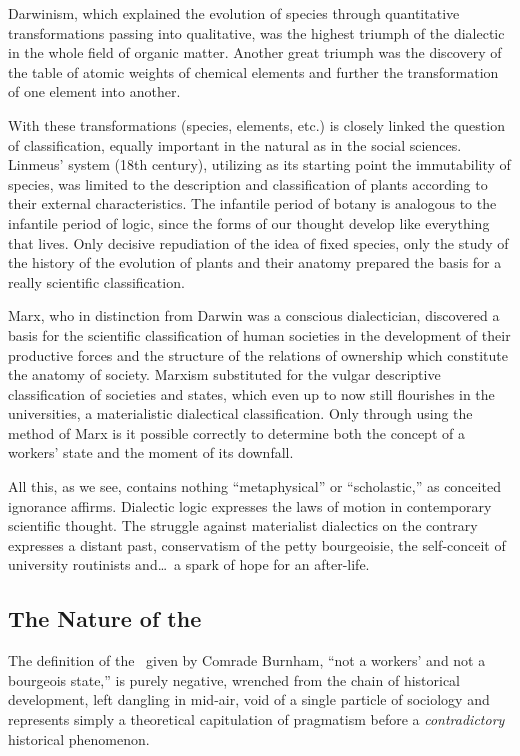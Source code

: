 Darwinism, which explained the evolution of species through quantitative transformations passing into qualitative, was the highest triumph of the dialectic in the whole field of organic matter. Another great triumph was the discovery of the table of atomic weights of chemical elements and further the transformation of one element into another.

With these transformations (species, elements, etc.) is closely linked the question of classification, equally important in the natural as in the social sciences. Linmeus’ system (18th century), utilizing as its starting point the immutability of species, was limited to the description and classification of plants according to their external characteristics. The infantile period of botany is analogous to the infantile period of logic, since the forms of our thought develop like everything that lives. Only decisive repudiation of the idea of fixed species, only the study of the history of the evolution of plants and their anatomy prepared the basis for a really scientific classification.

Marx, who in distinction from Darwin was a conscious dialectician, discovered a basis for the scientific classification of human societies in the development of their productive forces and the structure of the relations of ownership which constitute the anatomy of society. Marxism substituted for the vulgar descriptive classification of societies and states, which even up to now still flourishes in the universities, a materialistic dialectical classification. Only through using the method of Marx is it possible correctly to determine both the concept of a workers’ state and the moment of its downfall.

All this, as we see, contains nothing “metaphysical” or “scholastic,” as conceited ignorance affirms. Dialectic logic expresses the laws of motion in contemporary scientific thought. The struggle against materialist dialectics on the contrary expresses a distant past, conservatism of the petty bourgeoisie, the self-conceit of university routinists and\dots\ a spark of hope for an after-life.

\subsection*{The Nature of the \USSR}

The definition of the \USSR\ given by Comrade Burnham, “not a workers’ and not a bourgeois state,” is purely negative, wrenched from the chain of historical development, left dangling in mid-air, void of a single particle of sociology and represents simply a theoretical capitulation of pragmatism before a \emph{contradictory} historical phenomenon.

